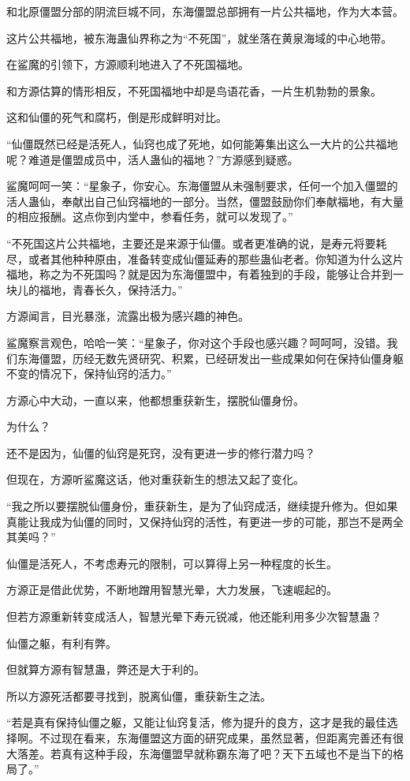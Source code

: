 \begin{this_body}
和北原僵盟分部的阴流巨城不同，东海僵盟总部拥有一片公共福地，作为大本营。

这片公共福地，被东海蛊仙界称之为“不死国”，就坐落在黄泉海域的中心地带。

在鲨魔的引领下，方源顺利地进入了不死国福地。

和方源估算的情形相反，不死国福地中却是鸟语花香，一片生机勃勃的景象。

这和仙僵的死气和腐朽，倒是形成鲜明对比。

“仙僵既然已经是活死人，仙窍也成了死地，如何能筹集出这么一大片的公共福地呢？难道是僵盟成员中，活人蛊仙的福地？”方源感到疑惑。

鲨魔呵呵一笑：“星象子，你安心。东海僵盟从未强制要求，任何一个加入僵盟的活人蛊仙，奉献出自己仙窍福地的一部分。当然，僵盟鼓励你们奉献福地，有大量的相应报酬。这点你到内堂中，参看任务，就可以发现了。”

“不死国这片公共福地，主要还是来源于仙僵。或者更准确的说，是寿元将要耗尽，或者其他种种原由，准备转变成仙僵延寿的那些蛊仙老者。你知道为什么这片福地，称之为不死国吗？就是因为东海僵盟中，有着独到的手段，能够让合并到一块儿的福地，青春长久，保持活力。”

方源闻言，目光暴涨，流露出极为感兴趣的神色。

鲨魔察言观色，哈哈一笑：“星象子，你对这个手段也感兴趣？呵呵呵，没错。我们东海僵盟，历经无数先贤研究、积累，已经研发出一些成果如何在保持仙僵身躯不变的情况下，保持仙窍的活力。”

方源心中大动，一直以来，他都想重获新生，摆脱仙僵身份。

为什么？

还不是因为，仙僵的仙窍是死窍，没有更进一步的修行潜力吗？

但现在，方源听鲨魔这话，他对重获新生的想法又起了变化。

“我之所以要摆脱仙僵身份，重获新生，是为了仙窍成活，继续提升修为。但如果真能让我成为仙僵的同时，又保持仙窍的活性，有更进一步的可能，那岂不是两全其美吗？”

仙僵是活死人，不考虑寿元的限制，可以算得上另一种程度的长生。

方源正是借此优势，不断地蹭用智慧光晕，大力发展，飞速崛起的。

但若方源重新转变成活人，智慧光晕下寿元锐减，他还能利用多少次智慧蛊？

仙僵之躯，有利有弊。

但就算方源有智慧蛊，弊还是大于利的。

所以方源死活都要寻找到，脱离仙僵，重获新生之法。

“若是真有保持仙僵之躯，又能让仙窍复活，修为提升的良方，这才是我的最佳选择啊。不过现在看来，东海僵盟这方面的研究成果，虽然显著，但距离完善还有很大落差。若真有这种手段，东海僵盟早就称霸东海了吧？天下五域也不是当下的格局了。”


\end{this_body}
